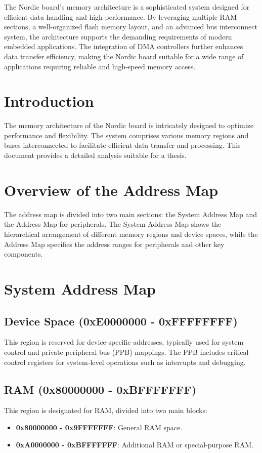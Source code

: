 \documentclass{Configuration_Files/PoliMi3i_thesis}
\begin{document}
The Nordic board's memory architecture is a sophisticated system designed for efficient data handling and high performance. By leveraging multiple RAM sections, a well-organized flash memory layout, and an advanced bus interconnect system, the architecture supports the demanding requirements of modern embedded applications. The integration of DMA controllers further enhances data transfer efficiency, making the Nordic board suitable for a wide range of applications requiring reliable and high-speed memory access.

\section{Introduction}
The memory architecture of the Nordic board is intricately designed to optimize performance and flexibility. The system comprises various memory regions and buses interconnected to facilitate efficient data transfer and processing. This document provides a detailed analysis suitable for a thesis.

\section{Overview of the Address Map}
The address map is divided into two main sections: the System Address Map and the Address Map for peripherals. The System Address Map shows the hierarchical arrangement of different memory regions and device spaces, while the Address Map specifies the address ranges for peripherals and other key components.

\section{System Address Map}

\subsection{Device Space (0xE0000000 - 0xFFFFFFFF)}
This region is reserved for device-specific addresses, typically used for system control and private peripheral bus (PPB) mappings. The PPB includes critical control registers for system-level operations such as interrupts and debugging.

\subsection{RAM (0x80000000 - 0xBFFFFFFF)}
This region is designated for RAM, divided into two main blocks:
\begin{itemize}
    \item \textbf{0x80000000 - 0x9FFFFFFF}: General RAM space.
    \item \textbf{0xA0000000 - 0xBFFFFFFF}: Additional RAM or special-purpose RAM.
\end{itemize}
\end{document}
